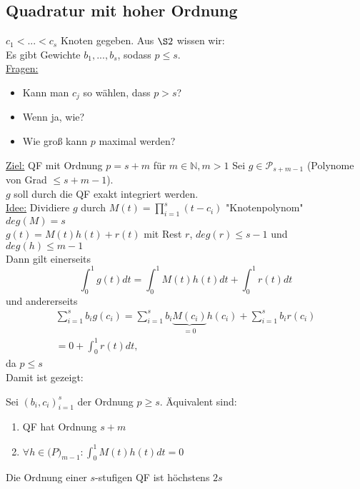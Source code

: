 \subsection{Quadratur mit hoher Ordnung}
$c_1< ... < c_s$ Knoten gegeben. Aus $\S2$ wissen wir: \\
Es gibt Gewichte $b_1, ..., b_s$, sodass $p \leq s$. \\
\underline{Fragen:} 
\begin{itemize}
  \item Kann man $c_j$ so wählen, dass $p>s$?
  \item Wenn ja, wie?
  \item Wie groß kann $p$ maximal werden?
\end{itemize}
\underline{Ziel:} QF mit Ordnung $p=s+m$ für $m \in \mathbb{N}, m > 1$
Sei $g \in \mathcal{P}_{s+m-1}$ (Polynome von Grad $\leq s+m-1$).\\
$g$ soll durch die QF exakt integriert werden.\\
\underline{Idee:} Dividiere $g$ durch $M(t) = \prod_{i=1}^s (t-c_i)$ "Knotenpolynom"\\
$deg(M) = s$ \\
$g(t) = M(t) h(t) + r(t)$ mit Rest $r$, $deg(r) \leq s-1$ und $deg(h) \leq m-1$ \\
Dann gilt einerseits
$$\int_0^1 g(t)dt = \int_0^1 M(t)h(t)dt + \int_0^1r(t)dt$$
und andererseits
\begin{gather*}\sum_{i=1}^s b_ig(c_i) = \sum_{i=1}^s b_i \underbrace{M(c_i)}_{= 0} h(c_i) + \sum_{i=1}^s b_ir(c_i) \\
 = 0 + \int_0^1 r(t)dt,\end{gather*}
 da $p \leq s$\\
Damit ist gezeigt:

\begin{theorem}
Sei $(b_i, c_i)_{i=1}^s$ der Ordnung $p \geq s$. Äquivalent sind:
\begin{enumerate}
  \item QF hat Ordnung $s+m$
  \item $\forall h \in \mathcal(P)_{m-1}:\int_0^1 M(t)h(t)dt = 0$
\end{enumerate}
\end{theorem}

\begin{korollar}
Die Ordnung einer $s$-stufigen QF ist höchstens $2s$
\end{korollar}

